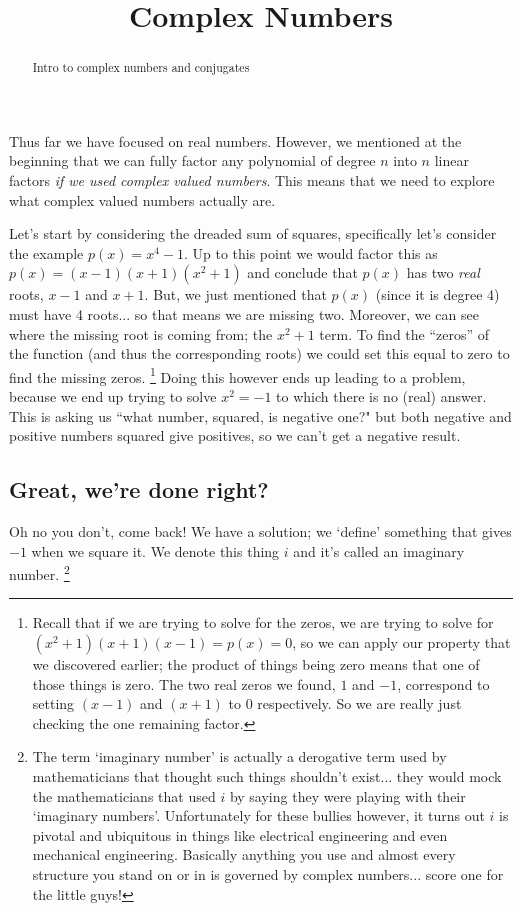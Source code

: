 \documentclass{ximeraXloud}
\title{Complex Numbers}
\begin{document}
\begin{abstract}
    Intro to complex numbers and conjugates
\end{abstract}
\maketitle

Thus far we have focused on real numbers. However, we mentioned at the beginning that we can fully factor any polynomial of degree $n$ into $n$ linear factors \textit{if we used complex valued numbers}. This means that we need to explore what complex valued numbers actually are.

Let's start by considering the dreaded sum of squares, specifically let's consider the example $p(x) = x^4 - 1$. Up to this point we would factor this as $p(x) = (x - 1)(x + 1)(x^2 + 1)$ and conclude that $p(x)$ has two \textit{real} roots, $x - 1$ and $x + 1$. But, we just mentioned that $p(x)$ (since it is degree 4) must have 4 roots... so that means we are missing two. Moreover, we can see where the missing root is coming from; the $x^2 + 1$ term. To find the ``zeros'' of the function (and thus the corresponding roots) we could set this equal to zero to find the missing zeros.%
\footnote{Recall that if we are trying to solve for the zeros, we are trying to solve for $(x^2 + 1)(x+1)(x-1)=p(x) = 0$, so we can apply our property that we discovered earlier; the product of things being zero means that one of those things is zero. The two real zeros we found, $1$ and $-1$, correspond to setting $(x-1)$ and $(x+1)$ to $0$ respectively. So we are really just checking the one remaining factor.}
Doing this however ends up leading to a problem, because we end up trying to solve $x^2 = -1$ to which there is no (real) answer. This is asking us ``what number, squared, is negative one?" but both negative and positive numbers squared give positives, so we can't get a negative result.

\subsection*{Great, we're done right?}
    Oh no you don't, come back! We have a solution; we `define' something that gives $-1$ when we square it. We denote this thing $i$ and it's called an imaginary number.%
    \footnote{%
        The term `imaginary number' is actually a derogative term used by mathematicians that thought such things shouldn't exist... they would mock the mathematicians that used $i$ by saying they were playing with their `imaginary numbers'. Unfortunately for these bullies however, it turns out $i$ is pivotal and ubiquitous in things like electrical engineering and even mechanical engineering. Basically anything you use and almost every structure you stand on or in is governed by complex numbers... score one for the little guys!%
        }
    
\end{document}
